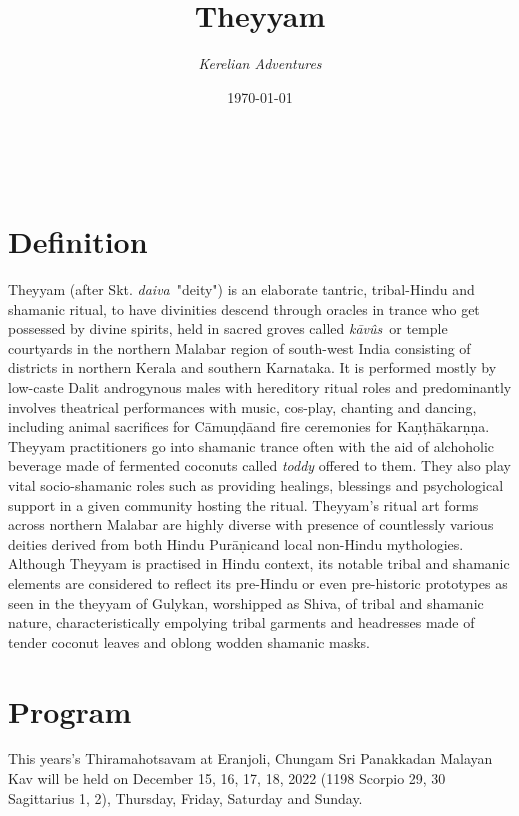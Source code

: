 \documentclass[a4paper, 11pt]{article} %
\title{\textbf{Theyyam}} %
\author{\textit{Kerelian Adventures}} %
\date{\today} %
\makeatletter
\newcommand{\camunda}[0]{C\={a}mu\d{n}\d{d}\={a}}
\newcommand{\kavus}[0]{\textit{k\={a}v\^{u}s}}
\newcommand{\kanthakarnna}[0]{Ka\d{n}\d{t}h\={a}kar\d{n}\d{n}a}
\newcommand{\puranic}[0]{Pur\={a}\d{n}ic}
\newcommand{\daiva}[0]{\textit{daiva}}
\renewcommand{\maketitle}{ %
\begin{flushright} %
{\LARGE\@title} %

\vspace{10pt} %

{\@author} %
\\\@date %

\vspace{30pt} %
\end{flushright}
}
\makeatother
\begin{document}
\maketitle %

\thispagestyle{empty}


\section{Definition}
  \label{sec:Definition}

Theyyam (after Skt. \daiva\ "deity") is an elaborate tantric, tribal-Hindu and shamanic ritual, to have divinities descend through oracles in trance who get possessed by divine spirits, held in sacred groves called \kavus\ or temple courtyards in the northern Malabar region of south-west India consisting of districts in northern Kerala and southern Karnataka. It is performed mostly by low-caste Dalit androgynous males with hereditory ritual roles and predominantly involves theatrical performances with music, cos-play, chanting and dancing, including animal sacrifices for \camunda and fire ceremonies for \kanthakarnna. Theyyam practitioners go into shamanic trance often with the aid of alchoholic beverage made of fermented coconuts called \textit{toddy} offered to them. They also play vital socio-shamanic roles such as providing healings, blessings and psychological support in a given community hosting the ritual. Theyyam's ritual art forms across northern Malabar are highly diverse with presence of countlessly various deities derived from both Hindu \puranic and local non-Hindu mythologies. Although Theyyam is practised in Hindu context, its notable tribal and shamanic elements are considered to reflect its pre-Hindu or even pre-historic prototypes as seen in the theyyam of Gulykan, worshipped as Shiva, of tribal and shamanic nature, characteristically empolying tribal garments and headresses made of tender coconut leaves and oblong wodden shamanic masks.




\section{Program}%
  \label{sec:Program}

This years's Thiramahotsavam at Eranjoli, Chungam Sri Panakkadan Malayan Kav will be held on December 15, 16, 17, 18, 2022 (1198 Scorpio 29, 30 Sagittarius 1, 2), Thursday, Friday, Saturday and Sunday.
\end{document}
